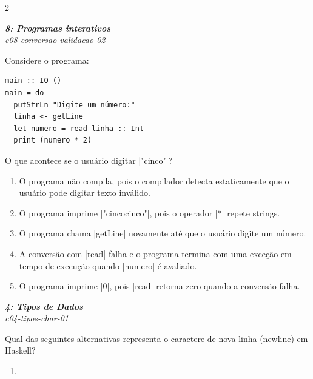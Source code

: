 \documentclass[a4paper,10pt,brazil]{article}
\begin{document}
\begin{multicols}{2}
\begin{enumerate}
\end{enumerate}

\begin{flushright}
  \footnotesize
  \textit{\textbf{8: Programas interativos}}\\
  \textit{c08-conversao-validacao-02}\\

\end{flushright}
Considere o programa:

\begin{verbatim}
main :: IO ()
main = do
  putStrLn "Digite um número:"
  linha <- getLine
  let numero = read linha :: Int
  print (numero * 2)
\end{verbatim}

O que acontece se o usuário digitar \haskellinline|"cinco"|?

\begin{enumerate}
  \item O programa não compila, pois o compilador detecta estaticamente que o usuário pode digitar texto inválido.

  \item O programa imprime \haskellinline|"cincocinco"|, pois o operador \haskellinline|*| repete strings.

  \item O programa chama \haskellinline|getLine| novamente até que o usuário digite um número.

  \item A conversão com \haskellinline|read| falha e o programa termina com uma exceção em tempo de execução quando \haskellinline|numero| é avaliado.

  \item O programa imprime \haskellinline|0|, pois \haskellinline|read| retorna zero quando a conversão falha.


\end{enumerate}

\begin{flushright}
  \footnotesize
  \textit{\textbf{4: Tipos de Dados}}\\
  \textit{c04-tipos-char-01}\\

\end{flushright}
Qual das seguintes alternativas representa o caractere de nova linha (newline) em Haskell?

\begin{enumerate}
  \item {}


\end{enumerate}
\end{multicols}
\end{document}
